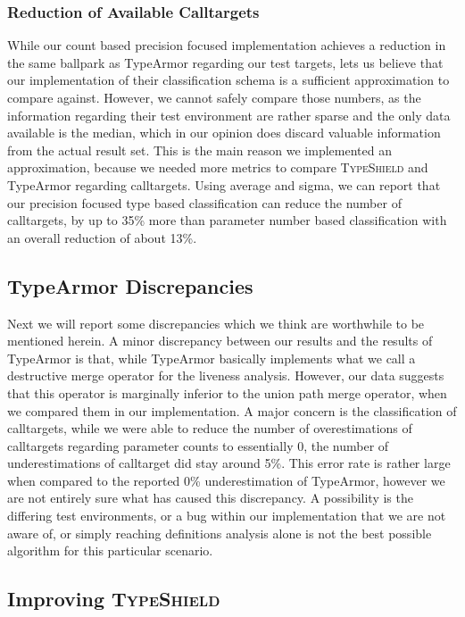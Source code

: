 \subsubsection{Reduction of Available Calltargets}
While our count based precision focused implementation achieves a reduction in the same ballpark as
TypeArmor regarding our test targets, lets us believe that our implementation of their classification
schema is a sufficient approximation to compare against. However, we cannot safely compare those numbers,
as the information regarding their test environment are rather sparse and the only data available is the
median, which in our opinion does discard valuable information from the actual result set. This is the
main reason we implemented an approximation, because we needed more metrics to compare \textsc{TypeShield}
and TypeArmor regarding calltargets. Using average and sigma, we can report that our precision focused
type based classification can reduce the number of calltargets, by up to 35\% more than parameter number
based classification with an overall reduction of about 13\%.

\subsection{TypeArmor Discrepancies}
\label{section:discrep}
Next we will report some discrepancies which we think are worthwhile to be mentioned herein.
A minor discrepancy between our results and the results of TypeArmor is that, while TypeArmor basically implements
what we call a destructive merge operator for the liveness analysis. However, our data suggests that this
operator is marginally inferior to the union path merge operator, when we compared them in our implementation.
A major concern is the classification of calltargets, while we were able to reduce the number of overestimations
of calltargets regarding parameter counts to essentially 0, the number of underestimations of calltarget did
stay around 5\%. This error rate is rather large when compared to the reported 0\% underestimation
of TypeArmor, however we are not entirely sure what has caused this discrepancy. A possibility is the differing
test environments, or a bug within our implementation that we are not aware of, or simply reaching definitions
analysis alone is not the best possible algorithm for this particular scenario.

\subsection{Improving \textsc{TypeShield}}
\label{section:venuesimp}

